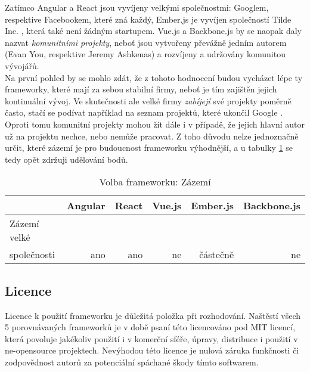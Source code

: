 Zatímco Angular a React jsou vyvíjeny velkými společnostmi: Googlem, respektive Facebookem, které zná každý, Ember.js je vyvíjen společností Tilde Inc. \cite{tilde}, která také není žádným startupem. Vue.js a Backbone.js by se naopak daly nazvat \emph{komunitními projekty}, neboť jsou vytvořeny převážně jedním autorem (Evan You, respektive Jeremy Ashkenas) a rozvíjeny a udržovány komunitou vývojářů. 
\\
Na první pohled by se mohlo zdát, že z tohoto hodnocení budou vycházet lépe ty frameworky, které mají za sebou stabilní firmy, neboť je tím zajištěn jejich kontinuální vývoj. Ve skutečnosti ale velké firmy \emph{zabíjejí} své projekty poměrně často, stačí se podívat například na seznam projektů, které ukončil Google \cite{killed_by_google}. Oproti tomu komunitní projekty mohou žít dále i v případě, že jejich hlavní autor už na projektu nechce, nebo nemůže pracovat. Z toho důvodu nelze jednoznačně určit, které zázemí je pro budoucnost frameworku výhodnější, a u tabulky \ref{table:compare:background} se tedy opět zdržuji udělování bodů.

\begin{table}[h]
\caption{Volba frameworku: Zázemí}
\label{table:compare:background}
\begin{tabular}{lrrrrr}
\hline
                                         & Angular                     & React                     & Vue.js                     & Ember.js                     & Backbone.js               \\ \hline
Zázemí velké\\společnosti                & ano                         & ano                       & ne                         & částečně                     & ne                        \\
\end{tabular}
\end{table}


\subsection{Licence}

Licence k použití frameworku je důležitá položka při rozhodování. Naštěstí všech 5 porovnávaných frameworků je v době psaní této licencováno pod MIT licencí, která povoluje jakékoliv použití i v komerční sféře, úpravy, distribuce i použití v ne-opensource projektech. Nevýhodou této licence je nulová záruka funkčnosti či zodpovědnost autorů za potenciální spáchané škody tímto softwarem.
\\
